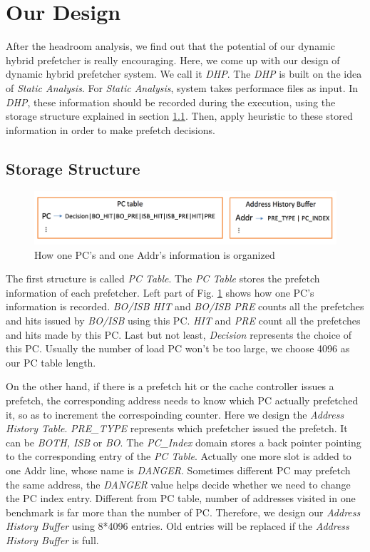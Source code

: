 \section{Our Design}
\label{sec:ourdesign}

After the headroom analysis, we find out that the potential of our dynamic hybrid prefetcher is really encouraging. Here, we come up with our design of dynamic hybrid prefetcher system. We call it \emph{DHP}. The \emph{DHP} is built on the idea of \emph{Static Analysis}. For \emph{Static Analysis}, system takes performace files as input. In \emph{DHP}, these information should be recorded during the execution, using the storage structure explained in section \ref{sec:storestruct}. Then, apply heuristic to these stored information in order to make prefetch decisions.

  \subsection{Storage Structure}
  \label{sec:storestruct}
  \begin{figure}[ht!]
	   \centering
	   \includegraphics[width=1.0\textwidth]{images/storage_struct.png}
	   \caption{How one PC's and one Addr's information is organized}
	   \label{fig:storage_struct}
  \end{figure}

  The first structure is called \emph{PC Table}. The \emph{PC Table} stores the prefetch information of each prefetcher. Left part of Fig. \ref{fig:storage_struct} shows how one PC's information is recorded. \emph{BO/ISB HIT} and \emph{BO/ISB PRE} counts all the prefetches and hits issued by \emph{BO/ISB} using this PC. \emph{HIT} and \emph{PRE} count all the prefetches and hits made by this PC. Last but not least, \emph{Decision} represents the choice of this PC. Usually the number of load PC won't be too large, we choose 4096 as our PC table length.

  On the other hand, if there is a prefetch hit or the cache controller issues a prefetch, the corresponding address needs to know which PC actually prefetched it, so as to increment the correspoinding counter. Here we design the \emph{Address History Table}. \emph{PRE\_TYPE} represents which prefetcher issued the prefetch. It can be \emph{BOTH, ISB} or \emph{BO}. The \emph{PC\_Index} domain stores a back pointer pointing to the corresponding entry of the \emph{PC Table}. Actually one more slot is added to one Addr line, whose name is \emph{DANGER}. Sometimes different PC may prefetch the same address, the \emph{DANGER} value helps decide whether we need to change the PC index entry. Different from PC table, number of addresses visited in one benchmark is far more than the number of PC. Therefore, we design our \emph{Address History Buffer} using 8*4096 entries. Old entries will be replaced if the \emph{Address History Buffer} is full.

